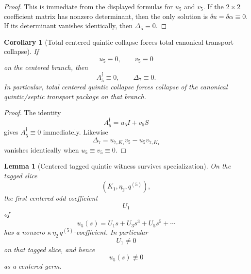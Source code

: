\documentclass[11pt,a4paper]{amsart}
\theoremstyle{plain}
\newtheorem{lemma}[theorem]{Lemma}
\newtheorem{corollary}[theorem]{Corollary}
\theoremstyle{definition}
\begin{document}
\begin{proof}
This is immediate from the displayed formulas for $u_5$ and $v_5$.
If the $2\times 2$ coefficient matrix has nonzero determinant, then the only
solution is $\delta u=\delta\alpha\equiv 0$. If its determinant vanishes
identically, then $\Delta_5\equiv 0$.
\end{proof}

\begin{corollary}[Total centered quintic collapse forces total canonical transport collapse]
\label{cor:total-centered-quintic-collapse-forces-total-transport-collapse}
If
\[
u_5\equiv 0,
\qquad
v_5\equiv 0
\]
on the centered branch, then
\[
A_5^{\mathfrak f}\equiv 0,
\qquad
\Delta_7\equiv 0.
\]
In particular, total centered quintic collapse forces collapse of the canonical
quintic/septic transport package on that branch.
\end{corollary}

\begin{proof}
The identity
\[
A_5^{\mathfrak f}=u_5 I+v_5 S
\]
gives $A_5^{\mathfrak f}\equiv 0$ immediately. Likewise
\[
\Delta_7=u_{7,K_1}v_5-u_5v_{7,K_1}
\]
vanishes identically when $u_5\equiv v_5\equiv 0$.
\end{proof}

\begin{lemma}[Centered tagged quintic witness survives specialization]
\label{lem:centered-tagged-quintic-witness-survives-specialization}
On the tagged slice
\[
(K_1,\eta_2,q^{(5)}),
\]
the first centered odd coefficient
\[
U_1
\]
of
\[
u_5(s)=U_1s+U_3s^3+U_5s^5+\cdots
\]
has a nonzero $\kappa\,\eta_2\,q^{(5)}$-coefficient. In particular
\[
U_1\neq 0
\]
on that tagged slice, and hence
\[
u_5(s)\not\equiv 0
\]
as a centered germ.
\end{lemma}
\end{document}
